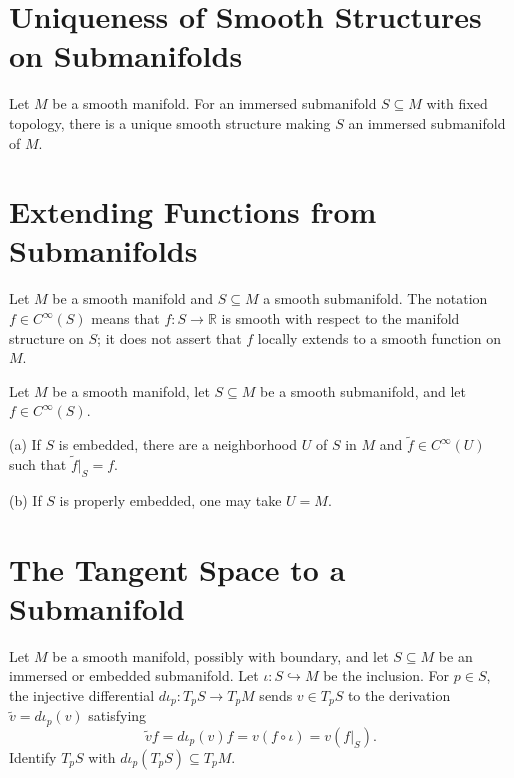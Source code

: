 \section{Uniqueness of Smooth Structures on Submanifolds}

\begin{theorem}
\label{thm:5-32}




Let $M$ be a smooth manifold. For an immersed submanifold $S\subseteq M$ with
fixed topology, there is a unique smooth structure making $S$ an immersed
submanifold of $M$.
\end{theorem}


\section{Extending Functions from Submanifolds}

\begin{notation}
\label{not:5-34-extra-1}



Let $M$ be a smooth manifold and $S\subseteq M$ a smooth submanifold. The
notation $f\in C^\infty(S)$ means that $f:S\to\mathbb R$ is smooth with
respect to the manifold structure on $S$; it does not assert that $f$ locally
extends to a smooth function on $M$.
\end{notation}

\begin{lemma}
\label{lem:5-34}




Let $M$ be a smooth manifold, let $S\subseteq M$ be a smooth submanifold, and
let $f\in C^\infty(S)$.

(a) If $S$ is embedded, there are a neighborhood $U$ of $S$ in $M$ and
$\widetilde f\in C^\infty(U)$ such that $\widetilde f|_S=f$.

(b) If $S$ is properly embedded, one may take $U=M$.
\end{lemma}


\section{The Tangent Space to a Submanifold}

\begin{notation}
\label{not:5-35-extra-1}




Let $M$ be a smooth manifold, possibly with boundary, and let $S\subseteq M$ be
an immersed or embedded submanifold. Let $\iota:S\hookrightarrow M$ be the
inclusion. For $p\in S$,
the injective differential $d\iota_p:T_pS\to T_pM$ sends $v\in T_pS$ to the
derivation $\widetilde v=d\iota_p(v)$ satisfying
\[
\widetilde v f=d\iota_p(v)f=v(f\circ\iota)=v(f|_S).
\]
Identify $T_pS$ with $d\iota_p(T_pS)\subseteq T_pM$.
\end{notation}

